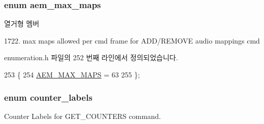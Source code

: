 \subsubsection[{\texorpdfstring{aem\+\_\+max\+\_\+maps}{aem_max_maps}}]{\setlength{\rightskip}{0pt plus 5cm}enum {\bf aem\+\_\+max\+\_\+maps}}\hypertarget{namespaceavdecc__lib_a97844c4fa619487e53c2854a07fd34d7}{}\label{namespaceavdecc__lib_a97844c4fa619487e53c2854a07fd34d7}
\begin{Desc}
\item[열거형 멤버]\par
\begin{description}
\item[{\em 
A\+E\+M\+\_\+\+M\+A\+X\+\_\+\+M\+A\+PS\hypertarget{namespaceavdecc__lib_a97844c4fa619487e53c2854a07fd34d7aeea9bc815c3177c9b296244acb544cc9}{}\label{namespaceavdecc__lib_a97844c4fa619487e53c2854a07fd34d7aeea9bc815c3177c9b296244acb544cc9}
}]1722. max maps allowed per cmd frame for A\+D\+D/\+R\+E\+M\+O\+VE audio mappings cmd \end{description}
\end{Desc}


enumeration.\+h 파일의 252 번째 라인에서 정의되었습니다.


\begin{DoxyCode}
253 \{
254     \hyperlink{namespaceavdecc__lib_a97844c4fa619487e53c2854a07fd34d7aeea9bc815c3177c9b296244acb544cc9}{AEM\_MAX\_MAPS} = 63 
255 \};
\end{DoxyCode}
\subsubsection[{\texorpdfstring{counter\+\_\+labels}{counter_labels}}]{\setlength{\rightskip}{0pt plus 5cm}enum {\bf counter\+\_\+labels}}\hypertarget{namespaceavdecc__lib_a831be56dba8ac423258a9374a1202df4}{}\label{namespaceavdecc__lib_a831be56dba8ac423258a9374a1202df4}


Counter Labels for G\+E\+T\+\_\+\+C\+O\+U\+N\+T\+E\+RS command. 

